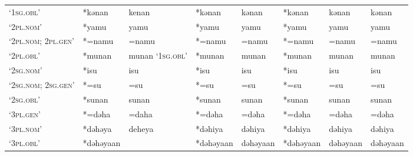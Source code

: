 \begin{landscape}
\begin{longtable}[c]{@{}p{3cm}<{\raggedright}p{2.75cm}<{\raggedright}p{2.75cm}<{\raggedright}p{2.75cm}<{\raggedright}p{2.75cm}<{\raggedright}p{2.75cm}<{\raggedright}p{2.75cm}<{\raggedright}p{2.75cm}<{\raggedright}@{}}
`\textsc{1sg.obl}'                                   & *kənan             & kenan                          & *kənan             & kənan                      & *kənan           & kənan                    & kənan                             \\
`\textsc{2pl.nom}'                                   & *yamu              & yamu                           & *yamu              & yamu                       & *yamu            & yamu                     & yamu                              \\
`\textsc{2pl.nom; 2pl.gen}'                          & *=namu             & =namu                          & *=namu             & =namu                      & *=namu           & =namu                    & =namu                             \\
`\textsc{2pl.obl}'                                   & *munan             & munan `\textsc{1sg.obl}'                & *munan             & munan                      & *munan           & munan                    & munan                             \\
`\textsc{2sg.nom}'                                   & *isu               & isu                            & *isu               & isu                        & *isu             & isu                      & isu                               \\
`\textsc{2sg.nom; 2sg.gen}'                          & *=su               & =su                            & *=su               & =su                        & *=su             & =su                      & =su                               \\
`\textsc{2sg.obl}'                                   & *sunan             & sunan                          & *sunan             & sunan                      & *sunan           & sunan                    & sunan                             \\
`\textsc{3pl.gen}'                                   & *=dəha             & =daha                          & *=dəha             & =dəha                      & *=dəha           & =dəha                    & =dəha                             \\
`\textsc{3pl.nom}'                                   & *dəhəya            & deheya                         & *dəhiya            & dəhiya                     & *dəhiya          & dəhiya                   & dəhiya                            \\
`\textsc{3pl.obl}'                                   & *dəhəyaan          &                                & *dəhəyaan          & dəhəyaan                   & *dəhəyaan        & dəhəyaan                 & dəhəyaan                          \\

\end{longtable}
\end{landscape}

